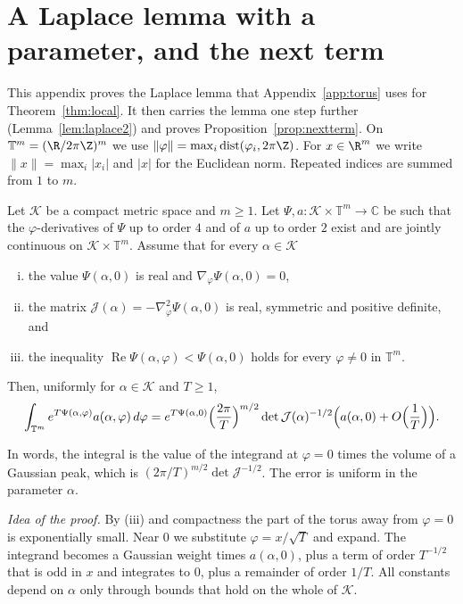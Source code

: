 \section{A Laplace lemma with a parameter, and the next term}\label{app:laplace}

This appendix proves the Laplace lemma that Appendix~\ref{app:torus} uses
for Theorem~\ref{thm:local}. It then carries the lemma one step further
(Lemma~\ref{lem:laplace2}) and proves Proposition~\ref{prop:nextterm}. On $\mathbb T^m=(\R/2\pi\Z)^m$ we use
$\lVert\varphi\rVert=\max_i\operatorname{dist}(\varphi_i,2\pi\Z)$. For
$x\in\R^m$ we write $\lVert x\rVert=\max_i|x_i|$ and $|x|$ for the Euclidean
norm. Repeated indices are summed from $1$ to $m$.

\begin{lemma}\label{lem:laplace}
Let $\mathcal K$ be a compact metric space and $m\ge1$. Let
$\Psi,a:\mathcal K\times\mathbb T^m\to\mathbb C$ be such that the
$\varphi$-derivatives of $\Psi$ up to order $4$ and of $a$ up to order $2$
exist and are jointly continuous on $\mathcal K\times\mathbb T^m$. Assume that
for every $\alpha\in\mathcal K$
\begin{enumerate}[(i)]
\item the value $\Psi(\alpha,0)$ is real and $\nabla_\varphi\Psi(\alpha,0)=0$,
\item the matrix $\mathcal J(\alpha)=-\nabla^2_\varphi\Psi(\alpha,0)$ is real, symmetric
and positive definite, and
\item the inequality $\operatorname{Re}\Psi(\alpha,\varphi)<\Psi(\alpha,0)$ holds for every
$\varphi\ne0$ in $\mathbb T^m$.
\end{enumerate}
Then, uniformly for $\alpha\in\mathcal K$ and $T\ge1$,
\[
\int_{\mathbb T^m}e^{T\Psi(\alpha,\varphi)}a(\alpha,\varphi)\,d\varphi
=e^{T\Psi(\alpha,0)}\Bigl(\frac{2\pi}T\Bigr)^{m/2}\det\mathcal J(\alpha)^{-1/2}
\Bigl(a(\alpha,0)+O\Bigl(\frac1T\Bigr)\Bigr).
\]
\end{lemma}

In words, the integral is the value of the integrand at $\varphi=0$ times the
volume of a Gaussian peak, which is $(2\pi/T)^{m/2}\det\mathcal J^{-1/2}$. The
error is uniform in the parameter $\alpha$.

\emph{Idea of the proof.} By (iii) and compactness the part of the torus away
from $\varphi=0$ is exponentially small. Near $0$ we substitute
$\varphi=x/\sqrt T$ and expand. The integrand becomes a Gaussian weight times
$a(\alpha,0)$, plus a term of order $T^{-1/2}$ that is odd in $x$ and
integrates to $0$, plus a remainder of order $1/T$. All constants depend on
$\alpha$ only through bounds that hold on the whole of $\mathcal K$.

